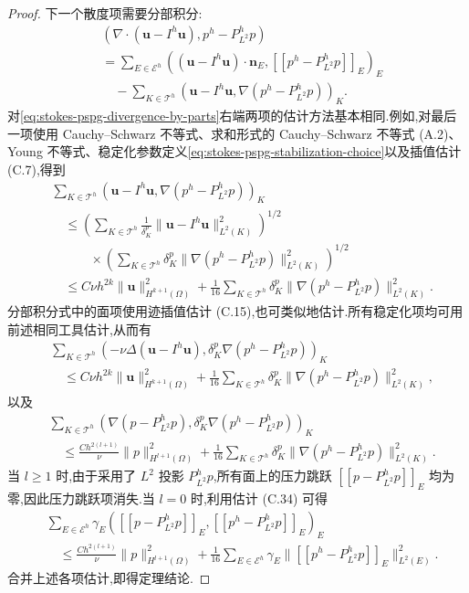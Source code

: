 \begin{proof}
下一个散度项需要分部积分:
\begin{equation}\label{eq:stokes-pspg-divergence-by-parts}
\begin{aligned}
 &(\nabla\cdot(\bm{u}-I^h\bm{u}),p^h-P_{L^2}^h p)\\
 &=\sum_{E\in\mathcal{E}^h}
   ((\bm{u}-I^h\bm{u})\cdot\bm{n}_E,
       [[p^h-P_{L^2}^h p]]_E)_E\\
 &\quad-\sum_{K\in\mathcal{T}^h}
   (\bm{u}-I^h\bm{u},\nabla(p^h-P_{L^2}^h p))_K.
\end{aligned}
\end{equation}
对\cref{eq:stokes-pspg-divergence-by-parts}右端两项的估计方法基本相同.例如,对最后一项使用 Cauchy--Schwarz 不等式、求和形式的 Cauchy--Schwarz 不等式 (A.2)、Young 不等式、稳定化参数定义\cref{eq:stokes-pspg-stabilization-choice}以及插值估计 (C.7),得到
\[
\begin{aligned}
 &\sum_{K\in\mathcal{T}^h}
   (\bm{u}-I^h\bm{u},\nabla(p^h-P_{L^2}^h p))_K\\
 &\quad\leq
  \left(\sum_{K\in\mathcal{T}^h}\frac{1}{\delta_K^p}
        \|\bm{u}-I^h\bm{u}\|_{L^2(K)}^2\right)^{1/2}\\
 &\qquad\quad\times
  \left(\sum_{K\in\mathcal{T}^h}\delta_K^p
        \|\nabla(p^h-P_{L^2}^h p)\|_{L^2(K)}^2\right)^{1/2}\\
 &\quad\leq C\nu h^{2k}\|\bm{u}\|_{H^{k+1}(\Omega)}^2
  +\frac{1}{16}\sum_{K\in\mathcal{T}^h}\delta_K^p
        \|\nabla(p^h-P_{L^2}^h p)\|_{L^2(K)}^2.
\end{aligned}
\]
分部积分式中的面项使用迹插值估计 (C.15),也可类似地估计.所有稳定化项均可用前述相同工具估计,从而有
\[
\begin{aligned}
 &\sum_{K\in\mathcal{T}^h}
   (-\nu\Delta(\bm{u}-I^h\bm{u}),
         \delta_K^p\nabla(p^h-P_{L^2}^h p))_K\\
 &\quad\leq C\nu h^{2k}\|\bm{u}\|_{H^{k+1}(\Omega)}^2
  +\frac{1}{16}\sum_{K\in\mathcal{T}^h}\delta_K^p
       \|\nabla(p^h-P_{L^2}^h p)\|_{L^2(K)}^2,
\end{aligned}
\]
以及
\[
\begin{aligned}
 &\sum_{K\in\mathcal{T}^h}
   (\nabla(p-P_{L^2}^h p),
         \delta_K^p\nabla(p^h-P_{L^2}^h p))_K\\
 &\quad\leq \frac{C h^{2(l+1)}}{\nu}\|p\|_{H^{l+1}(\Omega)}^2
  +\frac{1}{16}\sum_{K\in\mathcal{T}^h}\delta_K^p
       \|\nabla(p^h-P_{L^2}^h p)\|_{L^2(K)}^2.
\end{aligned}
\]
当 $l\geq1$ 时,由于采用了 $L^2$ 投影 $P_{L^2}^h p$,所有面上的压力跳跃 $[[p-P_{L^2}^h p]]_E$ 均为零,因此压力跳跃项消失.当 $l=0$ 时,利用估计 (C.34) 可得
\[
\begin{aligned}
 &\sum_{E\in\mathcal{E}^h}\gamma_E
   ([[p-P_{L^2}^h p]]_E,[[p^h-P_{L^2}^h p]]_E)_E\\
 &\quad\leq \frac{C h^{2(l+1)}}{\nu}\|p\|_{H^{l+1}(\Omega)}^2
  +\frac{1}{16}\sum_{E\in\mathcal{E}^h}\gamma_E
        \|[[p^h-P_{L^2}^h p]]_E\|_{L^2(E)}^2.
\end{aligned}
\]
合并上述各项估计,即得定理结论.
\end{proof}

